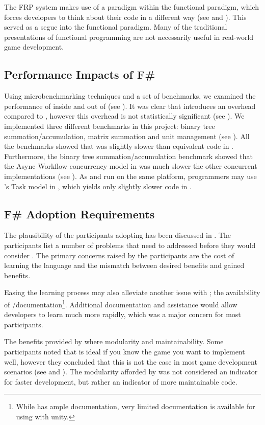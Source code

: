 The \gls{FRP} system makes use of a paradigm within the functional paradigm, which forces developers to think about their code in a different way (see  and ). This served as a segue into the functional paradigm. Many of the traditional presentations of functional programming are not necessarily useful in real-world game development.

\subsection{Performance Impacts of F\#}
Using microbenchmarking techniques and a set of benchmarks, we examined the performance of \fs inside and out of \unity (see ). It was clear that \fs introduces an overhead compared to \cs, however this overhead is not statistically significant (see ). We implemented three different benchmarks in this project: binary tree summation/accumulation, matrix summation and unit management (see ). All the benchmarks showed that \fs was slightly slower than equivalent code in \cs. Furthermore, the binary tree summation/accumulation benchmark showed that the Async Workflow concurrency model in \fs was much slower the other concurrent implementations (see ). As \cs and \fs run on the same platform, programmers may use \cs's Task model in \fs, which yields only slightly slower code in \fs.

\subsection{F\# Adoption Requirements}
The plausibility of the participants adopting \fs has been discussed in . The participants list a number of problems that need to addressed before they would consider \fs. The primary concerns raised by the participants are the cost of learning the language and the mismatch between desired benefits and gained benefits.

Easing the learning process may also alleviate another issue with \fs; the availability of \unity/\fs documentation\footnote{While \fs has ample documentation, very limited documentation is available for using \fs with unity.}. Additional documentation and assistance would allow developers to learn much more rapidly, which was a major concern for most participants.

The benefits provided by \fs where modularity and maintainability. Some participants noted that \fs is ideal if you know the game you want to implement well, however they concluded that this is not the case in most game development scenarios (see  and ). The modularity afforded by \fs was not considered an indicator for faster development, but rather an indicator of more maintainable code.

